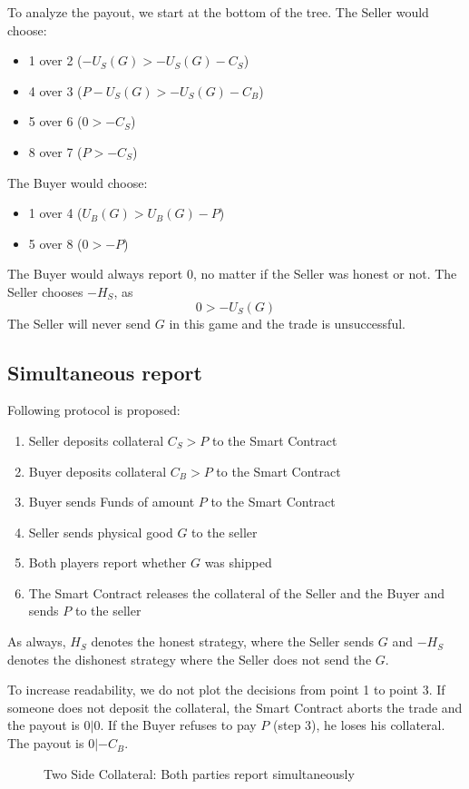 \documentclass{cacthesis}
\begin{document}
To analyze the payout, we start at the bottom of the tree. The Seller would choose:
\begin{itemize}
    \item 1 over 2 ($-U_S(G) > -U_S(G) -C_S$)
    \item 4 over 3 ($P -U_S(G) > -U_S(G) -C_B$)
    \item 5 over 6 ($0 > -C_S$)
    \item 8 over 7 ($P >-C_S$)
\end{itemize}
The Buyer would choose:
\begin{itemize}
    \item 1 over 4 ($U_B(G) > U_B(G) - P$)
    \item 5 over 8 ($0 > -P$)
\end{itemize}
The Buyer would always report 0, no matter if the Seller was honest or not.\newline
The Seller chooses $-H_S$, as 
\[0>-U_S(G)\]
The Seller will never send $G$ in this game and the trade is unsuccessful.

\subsection{Simultaneous report}
Following protocol is proposed:
\begin{enumerate}
    \item Seller deposits collateral $C_S > P$ to the Smart Contract
    \item Buyer deposits collateral $C_B > P$ to the Smart Contract
    \item Buyer sends Funds of amount $P$ to the Smart Contract
    \item Seller sends physical good $G$ to the seller
    \item Both players report whether $G$ was shipped
    \item The Smart Contract releases the collateral of the Seller and the Buyer and sends $P$ to the seller
\end{enumerate}
As always, $H_S$ denotes the honest strategy, where the Seller sends $G$ and $-H_S$ denotes the dishonest strategy where the Seller does not send the $G$.

To increase readability, we do not plot the decisions from point 1 to point 3. If someone does not deposit the collateral, the Smart Contract aborts the trade and the payout is $0|0$. If the Buyer refuses to pay $P$ (step 3), he loses his collateral. The payout is $0|-C_B$.\newline
\begin{figure}[htb!]
    \centering
    \caption{Two Side Collateral: Both parties report simultaneously}
\end{figure}
\end{document}
